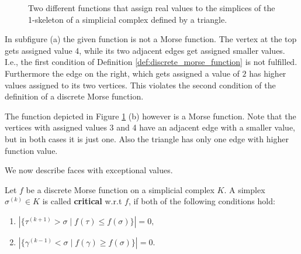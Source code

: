 \begin{figure}[H]

\begin{subfigure}[c]{0.49\textwidth}
\begin{center}

\end{center}
\end{subfigure}
\begin{subfigure}[c]{0.49\textwidth}
\begin{center}

\end{center}

\end{subfigure}
\caption{Two different functions that assign real values to the simplices of the 1-skeleton of a simplicial complex defined by a  triangle.}
\label{fig:morse_function}
\end{figure}

In subfigure (a) the given function is not a Morse function. The vertex at the top gets assigned value 4, while its two adjacent edges get assigned smaller values. I.e., the first condition of Definition \ref{def:discrete_morse_function} is not fulfilled. Furthermore the edge on the right, which gets assigned a value of $2$ has higher values assigned to its two vertices. This violates the second condition of the definition of a discrete Morse function.

The function depicted in Figure \ref{fig:morse_function} (b) however is a Morse function. Note that the vertices with assigned values 3 and 4 have an adjacent edge with a smaller value, but in both cases it is just one. Also the triangle has only one edge with higher function value. 

We now describe faces with exceptional values.

\begin{defi}
Let $f$ be a discrete Morse function on a simplicial complex $K$. A simplex $\sigma^{(k)} \in K$ is called \textbf{critical} w.r.t $f$, if both of the following conditions hold:
\begin{enumerate}
    \item $|\{\tau^{(k+1)}>\sigma \mid f(\tau) \leq f(\sigma)\}| = 0,$
    \item $|\{\gamma^{(k-1)}<\sigma \mid f(\gamma) \geq f(\sigma)\}| = 0.$
\end{enumerate}
\end{defi}

